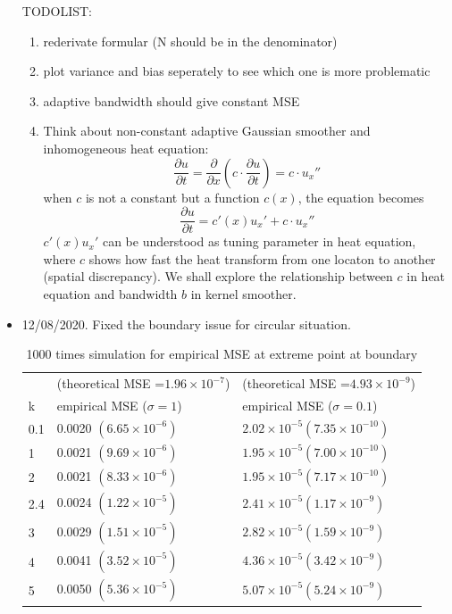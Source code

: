 \documentclass{article}
\begin{document}
\begin{itemize}
TODOLIST:
\begin{enumerate}
\item rederivate formular (N should be in the denominator)
\item plot variance and bias seperately to see which one is more problematic
\item adaptive bandwidth should give constant MSE
\item Think about non-constant adaptive Gaussian smoother and inhomogeneous heat equation:
$$ \frac{\partial u}{\partial t} = \frac{\partial}{\partial x}(c \cdot \frac{\partial u}{\partial t} ) =  c\cdot u_x''$$
when $c$ is not a constant but a function $c(x)$, the equation becomes 
$$ \frac{\partial u}{\partial t} = c'(x)u_x' + c\cdot u_x''$$
$c'(x)u_x' $ can be understood as tuning parameter in heat equation, where $c$ shows how fast the heat transform from one locaton to another (spatial discrepancy). We shall explore the relationship between $c$ in heat equation and bandwidth $b$ in kernel smoother. 
\end{enumerate}



\item 12/08/2020. 
Fixed the boundary issue for circular situation.

\begin{table}[H]
\centering
\begin{tabular}{l|l| l}
\hline\hline
& (theoretical MSE =$1.96\times 10^{-7}$) & (theoretical MSE =$4.93\times 10^{-9}$)\\
k & empirical MSE  ($\sigma=1$) &empirical MSE  ($\sigma=0.1$) \\\hline 
0.1&0.0020 $(6.65\times 10^{-6})$ & $2.02\times 10^{-5} (7.35\times 10^{-10})$\\
1 & 0.0021 $(9.69\times 10^{-6})$ & $1.95\times 10^{-5}  (7.00\times 10^{-10})$\\
2 & 0.0021 $(8.33\times 10^{-6})$ & $1.95\times 10^{-5} (7.17\times 10^{-10})$\\
2.4 & 0.0024 $(1.22\times 10^{-5})$ & $2.41\times 10^{-5} (1.17\times 10^{-9})$\\
3 & 0.0029 $(1.51\times 10^{-5})$ & $2.82\times 10^{-5} (1.59\times 10^{-9})$\\
4 & 0.0041 $(3.52\times 10^{-5})$ &  $4.36\times 10^{-5} (3.42\times 10^{-9})$\\
5 & 0.0050 $(5.36\times 10^{-5})$ &  $5.07\times 10^{-5} (5.24\times 10^{-9})$\\\hline
\end{tabular}
\caption{1000 times simulation for empirical MSE at extreme point at boundary}
\end{table}



\end{itemize}
\end{document}
